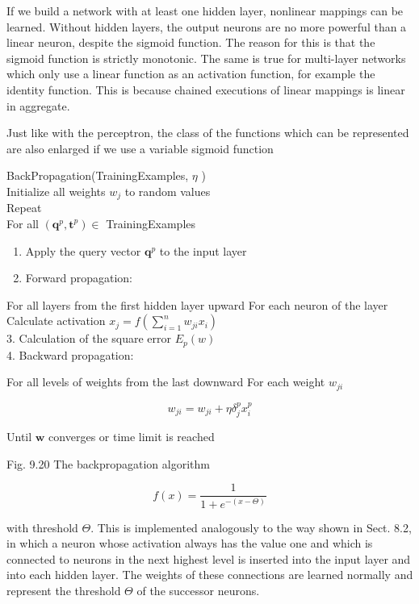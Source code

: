 \documentclass[10pt]{article}
\begin{document}
If we build a network with at least one hidden layer, nonlinear mappings can be learned. Without hidden layers, the output neurons are no more powerful than a linear neuron, despite the sigmoid function. The reason for this is that the sigmoid function is strictly monotonic. The same is true for multi-layer networks which only use a linear function as an activation function, for example the identity function. This is because chained executions of linear mappings is linear in aggregate.

Just like with the perceptron, the class of the functions which can be represented are also enlarged if we use a variable sigmoid function

BackPropagation(TrainingExamples, $\eta$ )\\
Initialize all weights $w_{j}$ to random values\\
Repeat\\
For all $\left(\boldsymbol{q}^{p}, \boldsymbol{t}^{p}\right) \in$ TrainingExamples

\begin{enumerate}
  \item Apply the query vector $\boldsymbol{q}^{p}$ to the input layer
  \item Forward propagation:
\end{enumerate}

For all layers from the first hidden layer upward For each neuron of the layer Calculate activation $x_{j}=f\left(\sum_{i=1}^{n} w_{j i} x_{i}\right)$\\
3. Calculation of the square error $E_{p}(w)$\\
4. Backward propagation:

For all levels of weights from the last downward For each weight $w_{j i}$

$$
w_{j i}=w_{j i}+\eta \delta_{j}^{p} x_{i}^{p}
$$

Until $\boldsymbol{w}$ converges or time limit is reached

Fig. 9.20 The backpropagation algorithm

$$
f(x)=\frac{1}{1+e^{-(x-\Theta)}}
$$

with threshold $\Theta$. This is implemented analogously to the way shown in Sect. 8.2, in which a neuron whose activation always has the value one and which is connected to neurons in the next highest level is inserted into the input layer and into each hidden layer. The weights of these connections are learned normally and represent the threshold $\Theta$ of the successor neurons.
\end{document}
